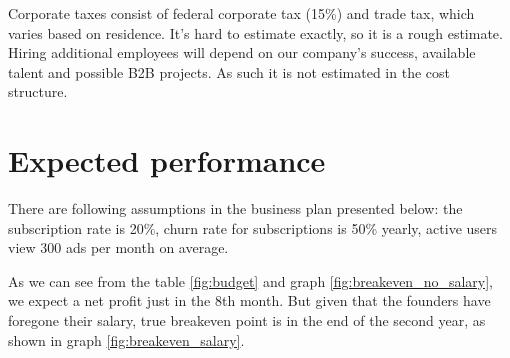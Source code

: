 Corporate taxes consist of federal corporate tax (15\%) and trade tax, which varies based on residence. It's hard to estimate exactly, so it is a rough estimate.
Hiring additional employees will depend on our company's success, available talent and possible B2B projects.
As such it is not estimated in the cost structure.

\section{Expected performance}

There are following assumptions in the business plan presented below: the subscription rate is 20\%, churn rate for subscriptions is 50\% yearly, active users view 300 ads per month on average.

\p
As we can see from the table \ref{fig:budget} and graph \ref{fig:breakeven_no_salary}, we expect a net profit just in the 8th month. But given that the founders have foregone their salary, true breakeven point is in the end of the second year, as shown in graph \ref{fig:breakeven_salary}.

